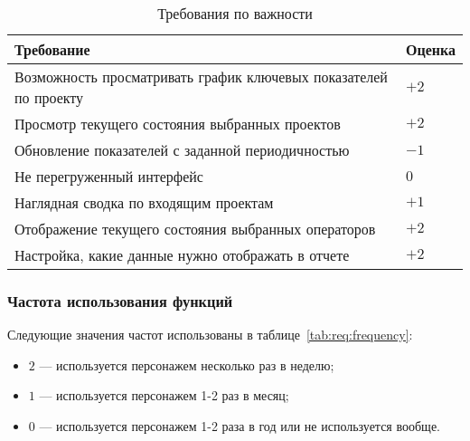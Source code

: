\begin{table}[ht]
    \caption{Требования по важности}
    \begin{small}
        \begin{tabular}{|p{}|p{}|}
            \hline
            Требование                          & Оценка \\
            \hline
            Возможность просматривать график ключевых показателей по проекту & $+2$  \\
            \hline
            Просмотр текущего состояния выбранных проектов           & $+2$    \\
            \hline
            Обновление показателей с заданной периодичностью               & $-1$ \\
            \hline
            Не перегруженный интерфейс               & $0$ \\
            \hline
            Наглядная сводка по входящим проектам               & $+1$ \\
            \hline
            Отображение текущего состояния выбранных операторов & $+2$ \\
            \hline
            Настройка, какие данные нужно отображать в отчете               & $+2$ \\
            \hline
        \end{tabular}
    \end{small}
    \label{tab:req:importance}
\end{table}

\subsubsection{Частота использования функций}

Следующие значения частот использованы в таблице~\ref{tab:req:frequency}:
\begin{itemize}
    \item $2$ --- используется персонажем несколько раз в неделю;
    \item $1$ --- используется персонажем 1-2 раз в месяц;
    \item $0$ --- используется персонажем 1-2 раза в год или не используется вообще.
\end{itemize}

